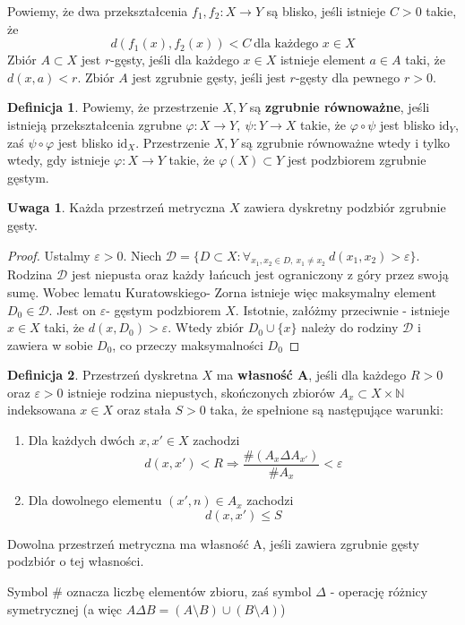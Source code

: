 \documentclass[licencjacka]{pracamgr}
\theoremstyle{definition}
\newtheorem{definition}{Definicja}[section]
\theoremstyle{definition}
\newtheorem{remark}{Uwaga}[section]
\theoremstyle{definition}
\theoremstyle{definition}
\theoremstyle{definition}
\theoremstyle{plain}
\theoremstyle{plain}
\begin{document}
Powiemy, że dwa przekształcenia $ f_1, f_2 : X \rightarrow Y $ są blisko, 
jeśli istnieje $ C > 0 $ takie, że $$ d(f_1(x), f_2(x)) < C  ~ \text{dla każdego } x \in X$$ 
Zbiór $ A \subset X $ jest $ r $-gęsty, jeśli dla każdego $ x \in X $ istnieje 
element $ a \in A $ taki, że $ d(x,a) < r $. Zbiór $ A $ jest zgrubnie gęsty, jeśli 
jest $ r $-gęsty dla pewnego $ r > 0 $.

\begin{definition}
	Powiemy, że przestrzenie $ X,Y $ są \textbf{zgrubnie równoważne}, jeśli 
	istnieją przekształcenia zgrubne $ \varphi : X \rightarrow Y, 
	~ \psi : Y \rightarrow X  $ takie, że 
	$ \varphi \circ \psi $ jest blisko $ \text{id}_Y $, zaś $ \psi \circ \varphi $ jest blisko 
	$ \text{id}_X $. Przestrzenie $ X,Y $ są zgrubnie równoważne wtedy i tylko wtedy, gdy 
	istnieje $ \varphi : X \rightarrow Y $ takie, że $ \varphi(X) \subset Y $ jest 
	podzbiorem zgrubnie gęstym.
\end{definition}

\begin{remark}
	Każda przestrzeń metryczna $ X $ zawiera dyskretny podzbiór zgrubnie gęsty.
\end{remark}
\begin{proof}
	Ustalmy $ \varepsilon > 0 $. Niech $ \mathcal{D} = \{D \subset X : \forall_{x_1, x_2 \in D, ~
	x_1 \neq x_2} ~ d(x_1, x_2) > \varepsilon \} $. Rodzina $ \mathcal{D} $ jest niepusta 
	oraz każdy łańcuch jest ograniczony z góry przez swoją sumę. Wobec lematu Kuratowskiego-
	Zorna istnieje więc maksymalny element $D_0 \in \mathcal{D}$. Jest on $ \varepsilon $-
	gęstym podzbiorem $ X $. Istotnie, załóżmy przeciwnie - istnieje $ x \in X $ taki, że 
	$ d(x, D_0) > \varepsilon $. Wtedy zbiór $ D_0 \cup \{x\} $ należy do rodziny 
	$ \mathcal{D} $ i zawiera w sobie $ D_0 $, co przeczy maksymalności $ D_0 $
\end{proof}

\begin{definition}
	Przestrzeń dyskretna $ X $ ma \textbf{własność A}, jeśli dla każdego $ R>0 $ oraz 
	$ \varepsilon > 0 $ istnieje rodzina niepustych, skończonych zbiorów $ A_x \subset 
	X \times \mathbb{N} $ indeksowana $ x \in X $ oraz stała $ S > 0 $ taka, że 
	spełnione są następujące warunki:
	\begin{enumerate}
		\item Dla każdych dwóch $ x,x' \in X $ zachodzi
		$$ d(x,x') < R \Rightarrow \frac{\# (A_x \Delta A_{x'})}{\# A_x} < \varepsilon$$
		\item Dla dowolnego elementu $(x', n) \in A_x$ zachodzi $$ d(x,x') \leq S $$
	\end{enumerate}
	Dowolna przestrzeń metryczna ma własność A, jeśli zawiera zgrubnie gęsty podzbiór 
	o tej własności.
\end{definition}
Symbol $ \# $ oznacza liczbę elementów zbioru, zaś symbol $ \Delta $ - operację 
różnicy symetrycznej (a więc $A \Delta B = (A \setminus B) \cup (B \setminus A)$)
\end{document}
